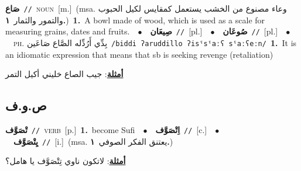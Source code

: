 \documentclass[10pt,a4paper,twoside]{article} %
\begin{document}
\begin{multicols}{2}
{\setlength\topsep{0pt}\textbf{\foreignlanguage{arabic}{صَاع}}\ {\color{gray}\texttt{//}\color{black}}\ \textsc{noun}\ [m.]\ \color{gray}(msa. \foreignlanguage{arabic}{وعاء مصنوع من الخشب يستعمل كمقايس لكيل الحبوب والتمور والثمار}~\foreignlanguage{arabic}{\textbf{١.}})\color{black}\ \textbf{1.}~A bowl made of wood, which is used as a scale for measuring grains, dates and fruits.\ \ $\bullet$\ \ \setlength\topsep{0pt}\textbf{\foreignlanguage{arabic}{صِيعَان}}\ {\color{gray}\texttt{//}\color{black}}\ [pl.]\ \ $\bullet$\ \ \setlength\topsep{0pt}\textbf{\foreignlanguage{arabic}{صُوعَان}}\ {\color{gray}\texttt{//}\color{black}}\ [pl.]\ \ $\bullet$\ \ \textsc{ph.} \color{gray} \foreignlanguage{arabic}{بِدِّي أَرُدِّله الصَّاع صَاعَين}\color{black}\ {\color{gray}\texttt{/{\sffamily biddi ʔaruddillo ʔisˤsˤaːʕ sˤaːʕeːn}/}\color{black}}\ \textbf{1.}~It is an idiomatic expression that means that sb is seeking revenge (retaliation)\  \begin{flushright}\color{gray}\foreignlanguage{arabic}{\textbf{\underline{\foreignlanguage{arabic}{أمثلة}}}: جيب الصاع خليني أكيل التمر}\end{flushright}\color{black}} \vspace{2mm}

\vspace{-3mm}
\subsection*{\color{blue}\foreignlanguage{arabic}{ص.و.ف}\color{blue}{}} 

{\setlength\topsep{0pt}\textbf{\foreignlanguage{arabic}{تْصَوَّف}}\ {\color{gray}\texttt{//}\color{black}}\ \textsc{verb}\ [p.]\ \textbf{1.}~become Sufi\ \ $\bullet$\ \ \setlength\topsep{0pt}\textbf{\foreignlanguage{arabic}{اِتْصَوَّف}}\ {\color{gray}\texttt{//}\color{black}}\ [c.]\ \ $\bullet$\ \ \setlength\topsep{0pt}\textbf{\foreignlanguage{arabic}{يِتْصَوَّف}}\ {\color{gray}\texttt{//}\color{black}}\ [i.]\ \color{gray}(msa. \foreignlanguage{arabic}{يعتنق الفكر الصوفي}~\foreignlanguage{arabic}{\textbf{١.}})\color{black}\  \begin{flushright}\color{gray}\foreignlanguage{arabic}{\textbf{\underline{\foreignlanguage{arabic}{أمثلة}}}: لاتكون ناوي تِتْصَوَّف يا هامل؟}\end{flushright}\color{black}} \vspace{2mm}


\end{multicols}
\end{document}

